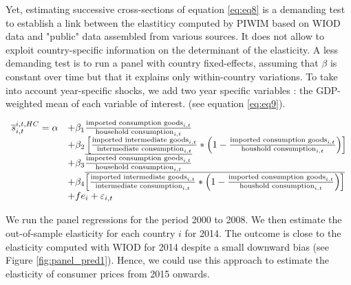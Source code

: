 \documentclass[11pt,a4paper]{article}
\begin{document}
Yet, estimating successive cross-sections of equation \ref{eq:eq8} is a demanding test to establish a link between the elastiticy computed by PIWIM based on WIOD data and "public" data assembled from various sources.
It does not allow to exploit country-specific information on the determinant of the elasticity.
A less demanding test is to run a panel with country fixed-effects, assuming that $\beta$ is constant over time but that it explains only within-country variations. To take into account year-specific shocks, we add two year specific variables : the GDP-weighted mean of each variable of interest. (see equation \ref{eq:eq9}). 


 \begin{equation}
\begin{array}{llll}
\overline{s}_{i,t}^{i,t,HC}= \alpha &+  \beta_1  \frac{\textnormal{imported consumption goods}_{i,t}}{\textnormal{household consumption}_{i,t}} \\
& + \beta_2 \left[ \frac{\textnormal{imported intermediate goods}_{i,t}}{\textnormal{intermediate consumption}_{i,t}}*\left(1-\frac{\textnormal{imported consumption goods}_{i,t}}{\textnormal{houshold consumption}_{i,t}}\right) \right] \\ 
&+  \beta_3 \overline{\frac{\textnormal{imported consumption goods}_{i,t}}{\textnormal{household consumption}_{i,t}}}  \\
& + \beta_4  \overline{\left[ \frac{\textnormal{imported intermediate goods}_{i,t}}{\textnormal{intermediate consumption}_{i,t}}*\left(1-\frac{\textnormal{imported consumption goods}_{i,t}}{\textnormal{houshold consumption}_{i,t}}\right) \right]} \\ 
& +fe_{i}+\varepsilon_{i,t}
\end{array}
\label{eq:eq9}
\end{equation}

We run the panel regressions for the period 2000 to 2008.
We then estimate the out-of-sample elasticity for each country $i$ for 2014. 
The outcome is close to the elasticity computed with WIOD for 2014 despite a small downward bias (see Figure \ref{fig:panel_pred1}).
Hence, we could use this approach to estimate the elasticity of consumer prices from 2015 onwards.
\end{document}
